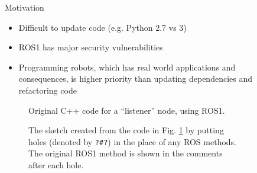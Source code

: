 \documentclass[final]{beamer}
\newlength{\sepwid}
\newlength{\onecolwid}
\newlength{\twocolwid}
\begin{document}
\begin{frame}[t]
\begin{columns}[t]
\begin{column}{\onecolwid}
\begin{block}{Motivation}

\begin{itemize}
\item Difficult to update code (e.g. Python 2.7 vs 3)
\item ROS1 has major security vulnerabilities
\item Programming robots, which has real world applications and consequences, is higher priority than updating dependencies and refactoring code
\end{itemize}

\end{block}


\begin{figure}

\caption{Original C++ code for a ``listener'' node, using ROS1.}
\label{fig:listenercode}
\end{figure}

\begin{figure}


\caption{The sketch created from the code in Fig. \ref{fig:listenercode} by putting holes (denoted by \texttt{?\#?}) in the place of any ROS methods. The original ROS1 method is shown in the comments after each hole.}
\label{fig:listenersketch}
\end{figure}


\end{column} %

\begin{column}{\sepwid}\end{column} %

\begin{column}{\twocolwid} %


\begin{figure}


\end{figure}
\end{column}
\end{columns}
\end{frame}
\end{document}
